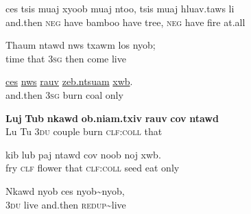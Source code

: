 \documentclass[output=paper]{LSP/langsci}
\begin{document}
\begin{exe}
 \label{JaexApp22}
\gll ces tsis muaj xyoob muaj ntoo, tsis muaj hluav.taws li\\
     and.then \textsc{neg} have bamboo have tree, \textsc{neg} have fire at.all\\
\glt  {}
\end{exe}

\begin{exe}
 \label{JaexApp23}
\gll Thaum ntawd nws txawm los nyob;\\
     time that \textsc{3sg} then come live\\
\glt  {}
\end{exe}

\begin{exe}
 \label{JaexApp24}
\gll \underline{ces} \underline{nws} \underline{rauv} \underline{zeb.ntsuam} \underline{xwb}.\\
     and.then 3\textsc{sg} burn coal only\\
\glt  {}
\end{exe}

\begin{exe}
 \label{JaexApp25}
\gll \textbf{Luj} \textbf{Tub} \textbf{nkawd} \textbf{ob.niam.txiv} \textbf{rauv} \textbf{cov} \textbf{ntawd}\\
     Lu Tu 3\textsc{du} couple burn \textsc{clf:coll} that\\
\glt  {}
\end{exe}

\begin{exe}
 \label{JaexApp26}
\gll kib lub paj ntawd cov noob noj xwb.\\
     fry \textsc{clf} flower that \textsc{clf:coll} seed eat only\\
\glt {}
\end{exe}

\begin{exe}
 \label{JaexApp27}
\gll Nkawd nyob ces nyob{\textasciitilde}nyob,\\
     3\textsc{du} live and.then \textsc{redup}{\textasciitilde}live\\
\glt {}
\end{exe}
\end{document}

